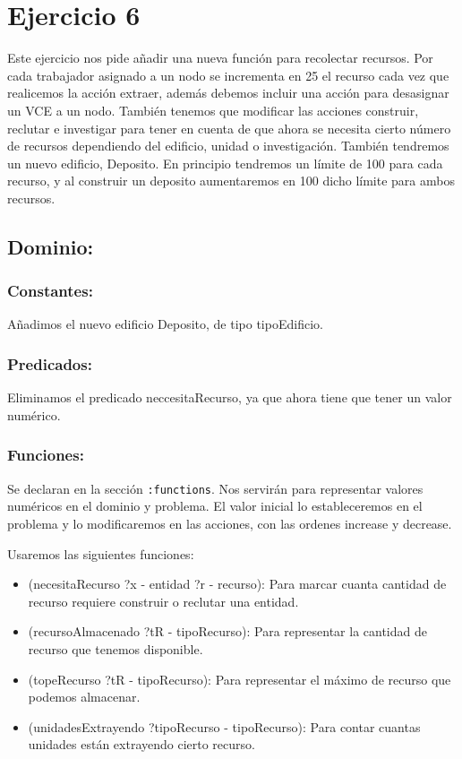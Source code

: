 \documentclass[10pt, spanish]{article}
\begin{document}
\section{Ejercicio 6}

Este ejercicio nos pide añadir una nueva función para recolectar recursos. Por cada trabajador asignado a un nodo se incrementa en 25 el recurso cada vez que realicemos la acción extraer, además debemos incluir una acción para desasignar un VCE a un nodo. También tenemos que modificar las acciones construir, reclutar e investigar para tener en cuenta de que ahora se necesita cierto número de recursos dependiendo del edificio, unidad o investigación. También tendremos un nuevo edificio, Deposito. En principio tendremos un límite de 100 para cada recurso, y al construir un deposito aumentaremos en 100 dicho límite para ambos recursos.

\subsection{Dominio:}

\subsubsection{Constantes:}

Añadimos el nuevo edificio Deposito, de tipo tipoEdificio.

\subsubsection{Predicados:}

Eliminamos el predicado neccesitaRecurso, ya que ahora tiene que tener un valor numérico.

\subsubsection{Funciones:}

Se declaran en la sección \texttt{:functions}. Nos servirán para representar valores numéricos en el dominio y problema. El valor inicial lo estableceremos en el problema y lo modificaremos en las acciones, con las ordenes increase y decrease.

Usaremos las siguientes funciones:

\begin{itemize}
	\item (necesitaRecurso ?x - entidad ?r - recurso): Para marcar cuanta cantidad de recurso requiere construir o reclutar una entidad.
	\item (recursoAlmacenado ?tR - tipoRecurso): Para representar la cantidad de recurso que tenemos disponible.
	\item (topeRecurso ?tR - tipoRecurso): Para representar el máximo de recurso que podemos almacenar.
	\item (unidadesExtrayendo ?tipoRecurso - tipoRecurso): Para contar cuantas unidades están extrayendo cierto recurso.
\end{itemize}
\end{document}
